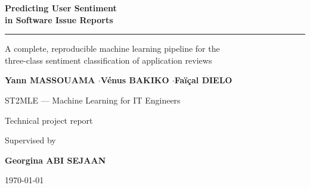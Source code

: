\documentclass[11pt,a4paper]{article}
\newcommand{\sectionrule}{\textcolor{accent}{\rule{\linewidth}{1.2pt}}}
\begin{document}
\begin{titlepage}
\centering
\vspace*{1.8cm}
{\color{primary}\Huge\bfseries Predicting User Sentiment\\[0.3cm] in Software Issue Reports\par}
\vspace{0.6cm}
\sectionrule\par
\vspace{0.6cm}
{\Large A complete, reproducible machine learning pipeline for the\\
three-class sentiment classification of application reviews\par}
\vspace{2.0cm}
{\large\bfseries Yann MASSOUAMA \quad$\cdot$\quad Vénus BAKIKO \quad$\cdot$\quad Faïçal DIELO\par}
\vspace{0.8cm}
{\large ST2MLE --- Machine Learning for IT Engineers\par}
\vspace{0.3cm}
{\large Technical project report\par}
\vspace{1.2cm}
{\large Supervised by\par}
\vspace{0.15cm}
{\large\bfseries Georgina ABI SEJAAN\par}
\vfill
{\small\today\par}
\end{titlepage}

\tableofcontents
\newpage

\end{document}

